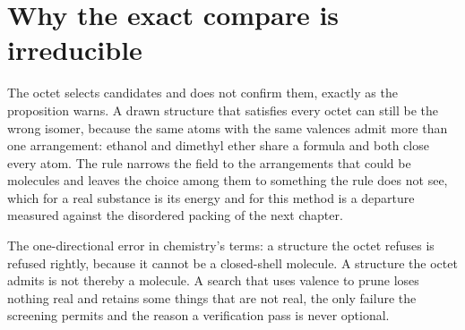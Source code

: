 \section{Why the exact compare is irreducible}

The octet selects candidates and does not confirm them, exactly as the proposition warns. A drawn
structure that satisfies every octet can still be the wrong isomer, because the same atoms with the
same valences admit more than one arrangement: ethanol and dimethyl ether share a formula and both
close every atom. The rule narrows the field to the arrangements that could be molecules and leaves
the choice among them to something the rule does not see, which for a real substance is its energy
and for this method is a departure measured against the disordered packing of the next chapter.

The one-directional error in chemistry's terms: a structure the octet refuses is refused rightly,
because it cannot be a closed-shell molecule. A structure the octet admits is not thereby a
molecule. A search that uses valence to prune loses nothing real and retains some things that are not
real, the only failure the screening permits and the reason a verification pass is never optional.
